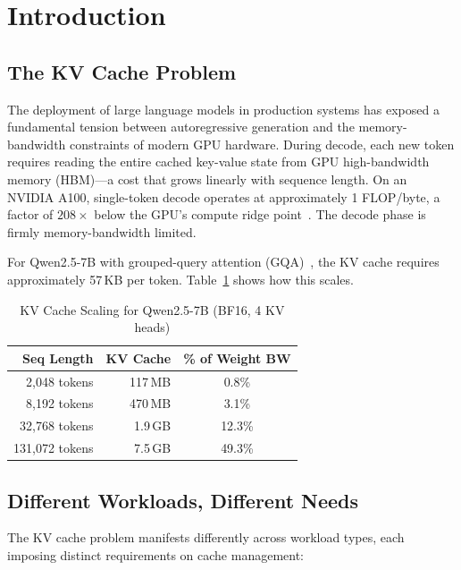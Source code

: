 \documentclass[conference]{IEEEtran}
\begin{document}
\section{Introduction}

\subsection{The KV Cache Problem}

The deployment of large language models in production systems has exposed a fundamental tension between autoregressive generation and the memory-bandwidth constraints of modern GPU hardware. During decode, each new token requires reading the entire cached key-value state from GPU high-bandwidth memory (HBM)---a cost that grows linearly with sequence length. On an NVIDIA A100, single-token decode operates at approximately 1 FLOP/byte, a factor of $208\times$ below the GPU's compute ridge point~\cite{roofline}. The decode phase is firmly memory-bandwidth limited.

For Qwen2.5-7B with grouped-query attention (GQA)~\cite{gqa}, the KV cache requires approximately 57\,KB per token. Table~\ref{tab:kv_scaling} shows how this scales.

\begin{table}[h]
\centering
\caption{KV Cache Scaling for Qwen2.5-7B (BF16, 4 KV heads)}
\label{tab:kv_scaling}
\begin{tabular}{@{}rrc@{}}
\toprule
\textbf{Seq Length} & \textbf{KV Cache} & \textbf{\% of Weight BW} \\
\midrule
2,048 tokens & 117\,MB & 0.8\% \\
8,192 tokens & 470\,MB & 3.1\% \\
32,768 tokens & 1.9\,GB & 12.3\% \\
131,072 tokens & 7.5\,GB & 49.3\% \\
\bottomrule
\end{tabular}
\end{table}

\subsection{Different Workloads, Different Needs}

The KV cache problem manifests differently across workload types, each imposing distinct requirements on cache management:
\end{document}

